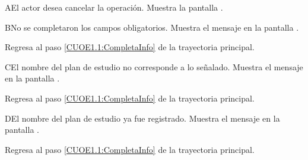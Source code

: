 \begin{UCtrayectoriaA}{A}{El actor desea cancelar la operación.}
	\UCpaso [\UCsist] Muestra la pantalla . 
\end{UCtrayectoriaA}

\begin{UCtrayectoriaA}{B}{No se completaron los campos obligatorios.}
	\UCpaso [\UCsist] Muestra el mensaje  en la pantalla .
	
	\UCpaso Regresa al paso \ref{CUOE1.1:CompletaInfo} de la trayectoria principal.
\end{UCtrayectoriaA}

\begin{UCtrayectoriaA}{C}{El nombre del plan de estudio no corresponde a lo señalado.}
	\UCpaso [\UCsist] Muestra el mensaje  en la pantalla .
	
	\UCpaso 
	Regresa al paso \ref{CUOE1.1:CompletaInfo} de la trayectoria principal.
\end{UCtrayectoriaA}

\begin{UCtrayectoriaA}{D}{El nombre del plan de estudio ya fue registrado.}
	\UCpaso [\UCsist] Muestra el mensaje  en la pantalla .
	
	\UCpaso Regresa al paso \ref{CUOE1.1:CompletaInfo} de la trayectoria principal.
\end{UCtrayectoriaA}


